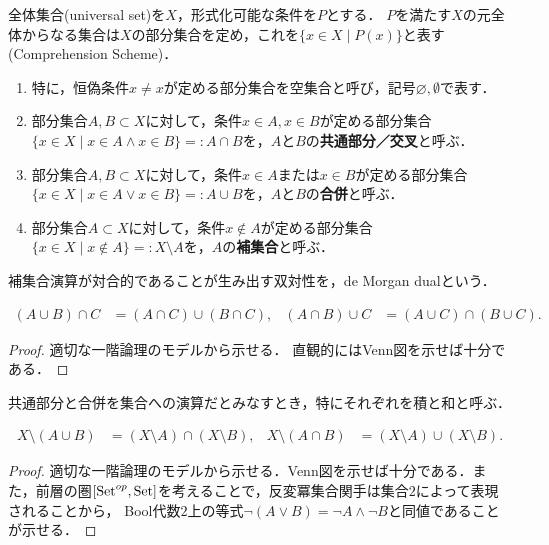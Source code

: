 \documentclass[uplatex, 12pt, dvipdfmx]{jsreport}
\begin{document}
\begin{axiom}
    全体集合(universal set)を$X$，形式化可能な条件を$P$とする．
    $P$を満たす$X$の元全体からなる集合は$X$の部分集合を定め，これを$\{x\in X\mid P(x)\}$と表す(Comprehension Scheme)．
    \begin{enumerate}
        \item 特に，恒偽条件$x\ne x$が定める部分集合を空集合と呼び，記号$\varnothing,\emptyset$で表す．
        \item 部分集合$A,B\subset X$に対して，条件$x\in A,x\in B$が定める部分集合$\{x\in X\mid x\in A\land x\in B\}=:A\cap B$を，$A$と$B$の\textbf{共通部分／交叉}と呼ぶ．
        \item 部分集合$A,B\subset X$に対して，条件$x\in A$または$x\in B$が定める部分集合$\{x\in X\mid x\in A\lor x\in B\}=:A\cup B$を，$A$と$B$の\textbf{合併}と呼ぶ．
        \item 部分集合$A\subset X$に対して，条件$x\notin A$が定める部分集合$\{x\in X\mid x\notin A\}=:X\setminus A$を，$A$の\textbf{補集合}と呼ぶ．
    \end{enumerate}
\end{axiom}
\begin{remark}
    補集合演算が対合的であることが生み出す双対性を，de Morgan dualという．
\end{remark}

\begin{proposition}[共通部分と合併についての分配則]
    \begin{align*}
        (A\cup B)\cap C&=(A\cap C)\cup(B\cap C),&(A\cap B)\cup C&=(A\cup C)\cap(B\cup C).
    \end{align*}
\end{proposition}
\begin{proof}
    適切な一階論理のモデルから示せる．
    直観的にはVenn図を示せば十分である．
\end{proof}
\begin{remark}
    共通部分と合併を集合への演算だとみなすとき，特にそれぞれを積と和と呼ぶ．
\end{remark}

\begin{proposition}[de Morganの法則]
    \begin{align*}
        X\setminus(A\cup B)&=(X\setminus A)\cap(X\setminus B),&X\setminus(A\cap B)&=(X\setminus A)\cup(X\setminus B).
    \end{align*}
\end{proposition}
\begin{proof}
    適切な一階論理のモデルから示せる．Venn図を示せば十分である．また，前層の圏$[\mathrm{Set}^{op},\mathrm{Set}]$を考えることで，反変冪集合関手は集合$2$によって表現されることから，
    Bool代数$2$上の等式$\lnot(A\lor B)=\lnot A\land \lnot B$と同値であることが示せる．
\end{proof}
\end{document}
